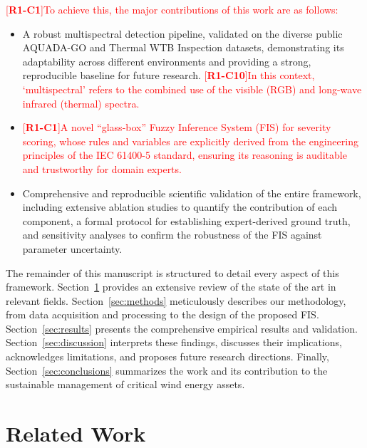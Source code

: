 \documentclass[energies,article,submit,pdftex,moreauthors]{Definitions/mdpi}
\newcommand{\revtag}[2]{[\textbf{R#1-C#2}]}
\newcommand{\Rone}[1]{\textcolor{red}{#1}}
\begin{document}
\Rone{\revtag{1}{1}To achieve this, the major contributions of this work are as follows:}
\begin{itemize}
    \item A robust multispectral detection pipeline, validated on the diverse public AQUADA-GO and Thermal WTB Inspection datasets, demonstrating its adaptability across different environments and providing a strong, reproducible baseline for future research. \Rone{\revtag{1}{10}In this context, `multispectral' refers to the combined use of the visible (RGB) and long-wave infrared (thermal) spectra.}
    \item \Rone{\revtag{1}{1}A novel ``glass-box'' Fuzzy Inference System (FIS) for severity scoring, whose rules and variables are explicitly derived from the engineering principles of the IEC 61400-5 standard, ensuring its reasoning is auditable and trustworthy for domain experts.}
    \item Comprehensive and reproducible scientific validation of the entire framework, including extensive ablation studies to quantify the contribution of each component, a formal protocol for establishing expert-derived ground truth, and sensitivity analyses to confirm the robustness of the FIS against parameter uncertainty.
\end{itemize}

The remainder of this manuscript is structured to detail every aspect of this framework. Section~\ref{sec:related_work} provides an extensive review of the state of the art in relevant fields. Section~\ref{sec:methods} meticulously describes our methodology, from data acquisition and processing to the design of the proposed FIS. Section~\ref{sec:results} presents the comprehensive empirical results and validation. Section~\ref{sec:discussion} interprets these findings, discusses their implications, acknowledges limitations, and proposes future research directions. Finally, Section~\ref{sec:conclusions} summarizes the work and its contribution to the sustainable management of critical wind energy assets.

\section{Related Work}\label{sec:related_work}
\end{document}
